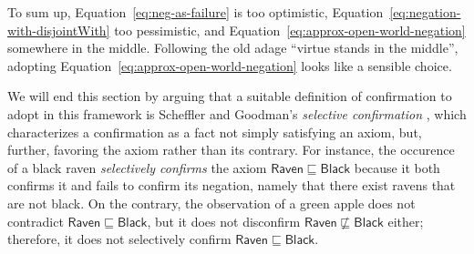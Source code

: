 \documentclass{llncs}
\begin{document}
To sum up, Equation~\ref{eq:neg-as-failure} is too optimistic,
Equation~\ref{eq:negation-with-disjointWith} too pessimistic, and
Equation~\ref{eq:approx-open-world-negation} somewhere in the middle.
Following the old adage ``virtue stands in the middle'', adopting
Equation~\ref{eq:approx-open-world-negation} looks like a sensible choice.

We will end this section by arguing that a suitable definition of confirmation to adopt in this
framework is Scheffler and Goodman's \emph{selective confirmation} \cite{SchefflerGoodman1972},
which characterizes a confirmation as a fact not simply satisfying an axiom, but, further,
favoring the axiom rather than its contrary.
For instance, the occurence of a black raven \emph{selectively confirms} the axiom
$\mathsf{Raven} \sqsubseteq \mathsf{Black}$ because it both confirms it and fails to confirm its
negation, namely that there exist ravens that are not black. On the contrary, the observation of
a green apple does not contradict $\mathsf{Raven} \sqsubseteq \mathsf{Black}$,
but it does not disconfirm $\mathsf{Raven} \not\sqsubseteq \mathsf{Black}$
either; therefore, it does not selectively confirm $\mathsf{Raven} \sqsubseteq \mathsf{Black}$.
\end{document}
